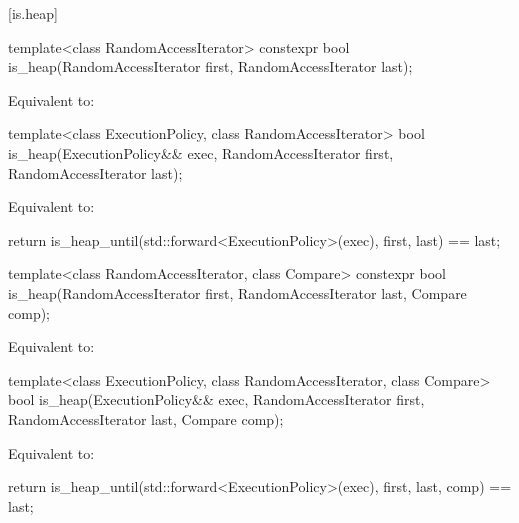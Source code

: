 [is.heap]{}

%
\begin{itemdecl}
template<class RandomAccessIterator>
  constexpr bool is_heap(RandomAccessIterator first, RandomAccessIterator last);
\end{itemdecl}

\begin{itemdescr}
\pnum
\effects
Equivalent to: 
\end{itemdescr}

%
\begin{itemdecl}
template<class ExecutionPolicy, class RandomAccessIterator>
  bool is_heap(ExecutionPolicy&& exec,
               RandomAccessIterator first, RandomAccessIterator last);
\end{itemdecl}

\begin{itemdescr}
\pnum
\effects
Equivalent to:
\begin{codeblock}
return is_heap_until(std::forward<ExecutionPolicy>(exec), first, last) == last;
\end{codeblock}
\end{itemdescr}

%
\begin{itemdecl}
template<class RandomAccessIterator, class Compare>
  constexpr bool is_heap(RandomAccessIterator first, RandomAccessIterator last,
                         Compare comp);
\end{itemdecl}

\begin{itemdescr}
\pnum
\effects
Equivalent to: 
\end{itemdescr}

%
\begin{itemdecl}
template<class ExecutionPolicy, class RandomAccessIterator, class Compare>
  bool is_heap(ExecutionPolicy&& exec,
               RandomAccessIterator first, RandomAccessIterator last,
               Compare comp);
\end{itemdecl}

\begin{itemdescr}
\pnum
\effects
Equivalent to:
\begin{codeblock}
return is_heap_until(std::forward<ExecutionPolicy>(exec), first, last, comp) == last;
\end{codeblock}
\end{itemdescr}

